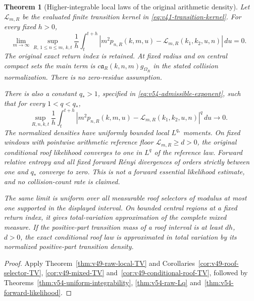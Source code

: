 \documentclass[11pt,reqno]{amsart}
\numberwithin{equation}{section}
\newtheorem{leadtheorem}{Theorem}
\theoremstyle{definition}\newtheorem{definition}[theorem]{Definition}
\theoremstyle{remark}\newtheorem{remark}[theorem]{Remark}
\begin{document}
\begin{leadtheorem}[Higher-integrable local laws of the original arithmetic density]
\label{thm:intro-v49-local-TV}
Let $\mathcal L_{m,R}$ be the evaluated finite transition kernel in
\eqref{eq:v41-transition-kernel}. For every fixed $h>0$,
\[
 \lim_{m\to\infty}\sup_{R,\,1\le n\le m,\,k,t}
 \frac1h\int_t^{t+h}
 |m^2p_{n,R}(k,m,u)-\mathcal L_{m,R}(k_1,k_2,u,n)|\,du=0.
\]
The original exact return index is retained. At fixed radius and on
central compact sets the main term is
$c\mathfrak a_R(k,n,m)g_{\Omega_R}$ in the stated collision
normalization. There is no zero-residue assumption.

There is also a constant $q_*>1$, specified in
\eqref{eq:v54-admissible-exponent}, such that for every $1<q<q_*$,
\[
 \sup_{R,n,k,t}\frac1h\int_t^{t+h}
 |m^2p_{n,R}(k,m,u)-\mathcal L_{m,R}(k_1,k_2,u,n)|^q\,du\to0.
\]
The normalized densities have uniformly bounded local $L^{q_*}$
moments. On fixed windows with pointwise arithmetic reference floor
$\mathcal L_{m,R}\ge d>0$, the original conditional roof likelihood
converges to one in $L^q$ of the reference law. Forward relative
entropy and all fixed forward R\'enyi divergences of orders strictly
between one and $q_*$ converge to zero. This is not a forward
essential likelihood estimate, and no collision-count rate is claimed.

The same limit is uniform over all measurable roof selectors of
modulus at most one supported in the displayed interval. On bounded
central regions at a fixed return index, it gives total-variation
approximation of the complete mixed measure. If the positive-part
transition mass of a roof interval is at least $dh$, $d>0$, the exact
conditional roof law is approximated in total variation by its
normalized positive-part transition density.
\end{leadtheorem}
\begin{proof}
Apply Theorem~\ref{thm:v49-raw-local-TV} and
Corollaries~\ref{cor:v49-roof-selector-TV}, \ref{cor:v49-mixed-TV}
and~\ref{cor:v49-conditional-roof-TV}, followed by
Theorems~\ref{thm:v54-uniform-integrability}, \ref{thm:v54-raw-Lq}
and~\ref{thm:v54-forward-likelihood}.
\end{proof}
\end{document}
